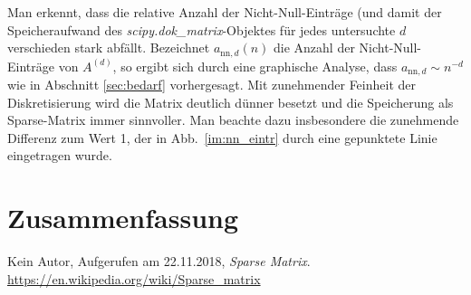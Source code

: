 \documentclass[smallheadings]{scrartcl}
\begin{document}
Man erkennt, dass die relative Anzahl der Nicht-Null-Einträge (und damit der Speicheraufwand des \textit{scipy.dok\_matrix}-Objektes für jedes untersuchte $d$ verschieden stark abfällt. Bezeichnet $a_{\text{nn},d}(n)$ die Anzahl der 
Nicht-Null-Einträge von $A^{(d)}$, so ergibt sich durch eine graphische Analyse, dass $a_{\text{nn},d}\sim n^{-d}$ wie in Abschnitt \ref{sec:bedarf} vorhergesagt. Mit zunehmender Feinheit der Diskretisierung wird die Matrix deutlich dünner besetzt und die Speicherung als Sparse-Matrix immer sinnvoller. Man beachte dazu insbesondere die zunehmende Differenz zum Wert 1, der in Abb.~\ref{im:nn_eintr} durch eine gepunktete Linie eingetragen wurde. 


\section{Zusammenfassung}


\begin{thebibliography}{9}
 Kein Autor, Aufgerufen am 22.11.2018, \textit{Sparse Matrix}. 
\url{https://en.wikipedia.org/wiki/Sparse_matrix}
\end{thebibliography}


\end{document}
